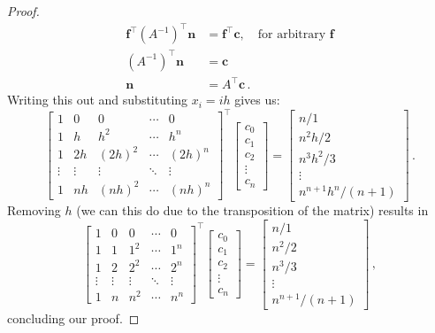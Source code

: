 \documentclass{article}
\begin{document}
\begin{proof}
\begin{align}
    \mathbf f^\top (A^{-1})^\top \mathbf n  &= \mathbf f^\top \mathbf c, \quad \textrm{for arbitrary $\mathbf f$} \nonumber \\
    (A^{-1})^\top \mathbf n  &= \mathbf c \nonumber \\
    \mathbf n  &= A^\top \mathbf c \,. \nonumber
\end{align}
Writing this out and substituting $x_i = ih$ gives us:
\begin{equation}
    \begin{bmatrix}
        1&0&0&\cdots&0 \\
        1&h&h^2&\cdots&h^n \\
        1&2h&(2h)^2&\cdots&(2h)^n \\
        \vdots&\vdots & \vdots & \ddots & \vdots\\
        1&nh&(nh)^2&\cdots&(nh)^n
    \end{bmatrix}^\top
    \begin{bmatrix}
        c_0 \\
        c_1 \\
        c_2 \\
        \vdots \\
        c_n
    \end{bmatrix}
    =
    \begin{bmatrix}
        n/1\\
        n^2h/2\\
        n^3h^2/3\\
        \vdots \\
        n^{n+1}h^n/(n+1)
    \end{bmatrix} \,. \nonumber
\end{equation}
Removing $h$ (we can this do due to the transposition of the matrix) results in
\begin{equation}
    \begin{bmatrix}
        1&0&0&\cdots&0 \\
        1&1&1^2&\cdots&1^n \\
        1&2&2^2&\cdots&2^n \\
        \vdots&\vdots & \vdots & \ddots & \vdots\\
        1&n&n^2&\cdots&n^n
    \end{bmatrix}^\top
    \begin{bmatrix}
        c_0 \\
        c_1 \\
        c_2 \\
        \vdots \\
        c_n
    \end{bmatrix}
    =
    \begin{bmatrix}
        n/1\\
        n^2/2\\
        n^3/3\\
        \vdots \\
        n^{n+1}/(n+1)
    \end{bmatrix} \,, \nonumber
\end{equation}
concluding our proof.
\end{proof}
\end{document}
